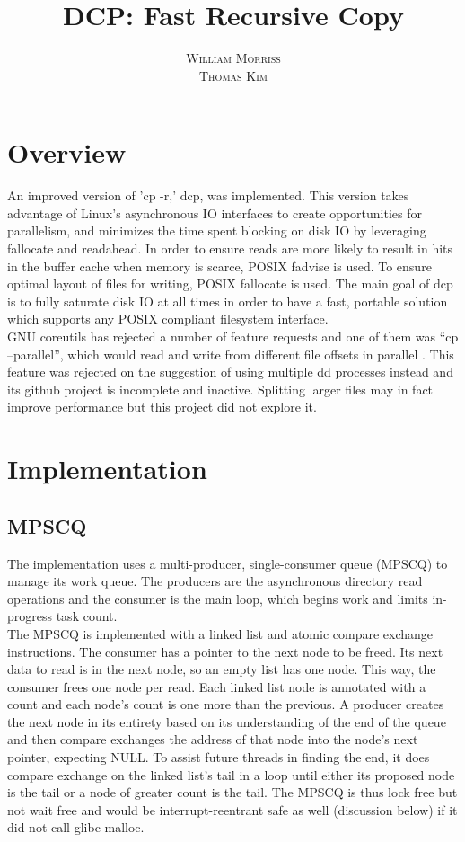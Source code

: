 \documentclass[12pt]{article}
\title{\vspace{-25mm}\fontsize{16pt}{10pt}\selectfont\textbf{DCP: Fast Recursive Copy}} %
\author{
  \textsc{William Morriss} \\
  \textsc{Thomas Kim}
}
\date{}
\begin{document}
\maketitle %

\section{Overview}
An improved version of 'cp -r,' dcp, was implemented.
This version takes advantage of Linux's asynchronous IO interfaces to create
opportunities for parallelism, and minimizes the time spent blocking on disk
IO by leveraging fallocate and readahead. In order to ensure reads
are more likely to result in hits in the buffer cache when memory is scarce, POSIX
fadvise is used. To ensure optimal layout of files for writing, POSIX
fallocate is used. The main goal of dcp is to fully saturate disk IO
at all times in order to have a fast, portable solution which supports
any POSIX compliant filesystem interface. \\

GNU coreutils has rejected \cite{rejected} a number of feature requests and one of them was
``cp --parallel'', which would read and write from different file offsets in
parallel \cite{cppara}. This feature was rejected on the suggestion of using multiple dd
processes instead and its github project \cite{pcopy} is incomplete and
inactive. Splitting larger files may in fact improve performance but this project
did not explore it.

\section{Implementation}

\subsection{MPSCQ}
The implementation uses a multi-producer, single-consumer queue (MPSCQ) to manage its
work queue. The producers are the asynchronous directory read operations and
the consumer is the main loop, which begins work and limits in-progress task
count. \\

The MPSCQ is implemented with a linked list and atomic compare exchange instructions.
The consumer has a pointer to the next node to be freed. Its next data to read
is in the next node, so an empty list has one node. This way, the consumer frees
one node per read. Each linked list node is annotated with a count and each
node's count is one more than the previous. A producer creates the next node in
its entirety based on its understanding of the end of the queue and then
compare exchanges the address of that node into the node's next pointer,
expecting NULL. To assist future threads in finding the end, it does compare
exchange on the linked list's tail in a loop until either its proposed node is
the tail or a node of greater count is the tail.
The MPSCQ is thus lock free but not wait free and would be interrupt-reentrant
safe as well (discussion below) if it did not call glibc malloc. \\
\end{document}
